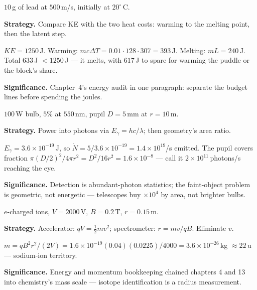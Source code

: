 \begin{example}\label{ex:w32}
$10$\,g of lead at $500$\,m/s, initially at $20^{\circ}$\,C.
\par\smallskip
\textbf{Strategy.} Compare KE with the two heat costs: warming to the
melting point, then the latent step.
\begin{solution}
$KE=1250$\,J. Warming: $mc\Delta T=0.01\cdot128\cdot307=393$\,J.
Melting: $mL=240$\,J. Total $633$\,J $<1250$\,J --- it melts, with
$617$\,J to spare for warming the puddle or the block's share.
\checkmark
\end{solution}
\textbf{Significance.} Chapter~4's energy audit in one paragraph:
separate the budget lines before spending the joules.
\end{example}

\begin{example}\label{ex:w33}
$100$\,W bulb, $5\%$ at $550$\,nm, pupil $D=5$\,mm at $r=10$\,m.
\par\smallskip
\textbf{Strategy.} Power into photons via $E_\gamma=hc/\lambda$; then
geometry's area ratio.
\begin{solution}
$E_\gamma=3.6\times10^{-19}$\,J, so
$\dot N=5/3.6\times10^{-19}=1.4\times10^{19}$/s emitted. The pupil
covers fraction $\pi(D/2)^{2}/4\pi r^{2}=D^{2}/16r^{2}
=1.6\times10^{-8}$ --- call it $2\times10^{11}$\,photons/s reaching
the eye. \checkmark
\end{solution}
\textbf{Significance.} Detection is abundant-photon statistics; the
faint-object problem is geometric, not energetic --- telescopes buy
$\times10^{4}$ by area, not brighter bulbs.
\end{example}

\begin{example}\label{ex:w34}
$e$-charged ions, $V=2000$\,V, $B=0.2$\,T, $r=0.15$\,m.
\par\smallskip
\textbf{Strategy.} Accelerator: $qV=\tfrac12mv^{2}$; spectrometer:
$r=mv/qB$. Eliminate $v$.
\begin{solution}
$m=qB^{2}r^{2}/(2V)=1.6\times10^{-19}(0.04)(0.0225)/4000
=3.6\times10^{-26}$\,kg $\approx22$\,u --- sodium-ion territory.
\checkmark
\end{solution}
\textbf{Significance.} Energy and momentum bookkeeping chained
chapters 4 and 13 into chemistry's mass scale --- isotope
identification is a radius measurement.
\end{example}

